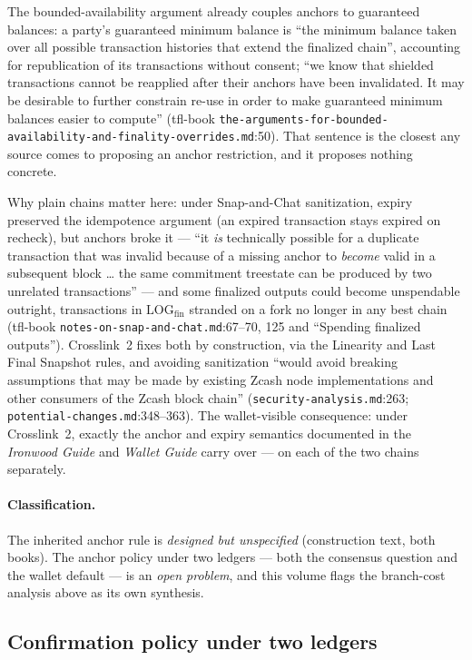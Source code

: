 \documentclass[11pt,a4paper]{article}
\theoremstyle{definition}
\begin{document}
The bounded-availability argument already couples anchors to guaranteed
balances: a party's guaranteed minimum balance is ``the minimum balance
taken over all possible transaction histories that extend the finalized
chain'', accounting for republication of its transactions without consent;
``we know that shielded transactions cannot be reapplied after their
anchors have been invalidated. It may be desirable to further constrain
re-use in order to make guaranteed minimum balances easier to compute''
(tfl-book
\texttt{the-arguments-for-bounded-availability-and-finality-overrides.md}:50).
That sentence is the closest any source comes to proposing an anchor
restriction, and it proposes nothing concrete.

Why plain chains matter here: under Snap-and-Chat sanitization, expiry
preserved the idempotence argument (an expired transaction stays expired
on recheck), but anchors broke it --- ``it \emph{is} technically possible
for a duplicate transaction that was invalid because of a missing anchor
to \emph{become} valid in a subsequent block \ldots{} the same commitment
treestate can be produced by two unrelated transactions'' --- and some
finalized outputs could become unspendable outright, transactions in
$\mathrm{LOG}_{\mathrm{fin}}$ stranded on a fork no longer in any best
chain (tfl-book \texttt{notes-on-snap-and-chat.md}:67--70, 125 and
``Spending finalized outputs''). Crosslink~2 fixes both by construction,
via the Linearity and Last Final Snapshot rules, and avoiding sanitization
``would avoid breaking assumptions that may be made by existing Zcash node
implementations and other consumers of the Zcash block chain''
(\texttt{security-analysis.md}:263; \texttt{potential-changes.md}:348--363).
The wallet-visible consequence: under Crosslink~2, exactly the anchor and
expiry semantics documented in the \emph{Ironwood Guide} and \emph{Wallet
Guide} carry over --- on each of the two chains separately.

\paragraph{Classification.} The inherited anchor rule is \emph{designed
but unspecified} (construction text, both books). The anchor policy under
two ledgers --- both the consensus question and the wallet default --- is
an \emph{open problem}, and this volume flags the branch-cost analysis
above as its own synthesis.

\subsection{Confirmation policy under two ledgers}
\label{sec:xl-confpolicy}
\end{document}
